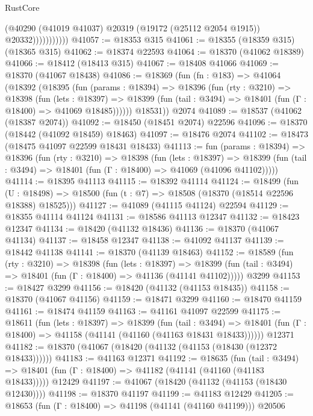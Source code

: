 \begin{lexlean}{RustCore}
\begin{coremodule}
                        (@40290
                          (@41019 @41037)
                          @20319
                          (@19172 (@25112 @2054 @1915))
                          @20332)))))))))))
@41057 := @18353 @315
@41061 := @18355 (@18359 @315) (@18365 @315)
@41062 := @18374 @22593
@41064 := @18370 (@41062 @18389)
@41066 := @18412 (@18413 @315)
@41067 := @18408 @41066
@41069 := @18370 (@41067 @18438)
@41086 := @18369
    (fun (fn : @183) =>
    @41064
      (@18392
        (@18395
          (fun (params : @18394) =>
          @18396
            (fun (rty : @3210) =>
            @18398
              (fun (lets : @18397) =>
              @18399 (fun (tail : @3494) => @18401 (fun (Γ : @18400) => @41069 @18485))))))
        @18531))
    @2074
@41089 := @18537 (@41062 (@18387 @2074))
@41092 := @18450 (@18451 @2074) @22596
@41096 := @18370 (@18442 (@41092 @18459) @18463)
@41097 := @18476 @2074
@41102 := @18473 (@18475 @41097 @22599 @18431 @18433)
@41113 := fun (params : @18394) =>
  @18396
    (fun (rty : @3210) =>
    @18398
      (fun (lets : @18397) =>
      @18399 (fun (tail : @3494) => @18401 (fun (Γ : @18400) => @41069 (@41096 @41102)))))
@41114 := @18395 @41113
@41115 := @18392 @41114
@41124 := @18499
    (fun (U : @18498) => @18500 (fun (t : @7) => @18508 (@18370 (@18514 @22596 @18388) @18525)))
@41127 := @41089 (@41115 @41124) @22594
@41129 := @18355 @41114 @41124
@41131 := @18586 @41113 @12347
@41132 := @18423 @12347
@41134 := @18420 (@41132 @18436)
@41136 := @18370 (@41067 @41134)
@41137 := @18458 @12347
@41138 := @41092 @41137
@41139 := @18442 @41138
@41141 := @18370 (@41139 @18463)
@41152 := @18589
    (fun (rty : @3210) =>
    @18398
      (fun (lets : @18397) =>
      @18399 (fun (tail : @3494) => @18401 (fun (Γ : @18400) => @41136 (@41141 @41102)))))
    @3299
@41153 := @18427 @3299
@41156 := @18420 (@41132 (@41153 @18435))
@41158 := @18370 (@41067 @41156)
@41159 := @18471 @3299
@41160 := @18470 @41159
@41161 := @18474 @41159
@41163 := @41161 @41097 @22599
@41175 := @18611
    (fun (lets : @18397) =>
    @18399
      (fun (tail : @3494) =>
      @18401 (fun (Γ : @18400) => @41158 (@41141 (@41160 (@41163 @18431 @18433))))))
    @12371
@41182 := @18370 (@41067 (@18420 (@41132 (@41153 (@18430 (@12372 @18433))))))
@41183 := @41163 @12371
@41192 := @18635
    (fun (tail : @3494) => @18401 (fun (Γ : @18400) => @41182 (@41141 (@41160 (@41183 @18433)))))
    @12429
@41197 := @41067 (@18420 (@41132 (@41153 (@18430 @12430))))
@41198 := @18370 @41197
@41199 := @41183 @12429
@41205 := @18653 (fun (Γ : @18400) => @41198 (@41141 (@41160 @41199))) @20506

\end{coremodule}
\end{lexlean}
